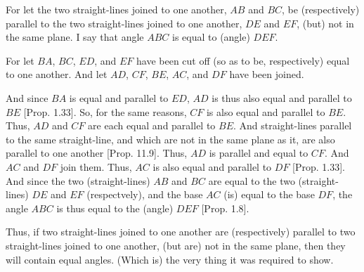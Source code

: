 \begin{Parallel}{}{}
{For let the two straight-lines joined to one another, $AB$ and $BC$, be (respectively) parallel to the two straight-lines joined to one another, $DE$ and $EF$, (but) not in the same plane. I say that angle $ABC$ is equal to
(angle) $DEF$.

For let $BA$, $BC$, $ED$, and $EF$ have been cut off (so as to be, respectively) equal
to one another. And let $AD$, $CF$, $BE$, $AC$, and $DF$
have been joined.

And since $BA$ is equal and parallel to $ED$, $AD$ is thus also equal
and parallel to $BE$ [Prop. 1.33]. So, for the
same reasons, $CF$ is also equal and parallel to $BE$. Thus, $AD$ and
$CF$ are each equal and parallel to $BE$. And straight-lines parallel to
the same straight-line, and which are not in the same plane as it, are also parallel
to one another [Prop. 11.9]. Thus, $AD$
is parallel and equal to $CF$. And $AC$ and $DF$ join them. Thus, $AC$
is also equal and parallel to $DF$ [Prop. 1.33].
And since the two (straight-lines) $AB$ and $BC$ are equal to the
two (straight-lines) $DE$ and $EF$ (respectvely),  and the base $AC$  (is) equal to the base $DF$, the angle $ABC$ is thus equal to the (angle) $DEF$   
[Prop. 1.8].

Thus, if two straight-lines joined to one another
are (respectively) parallel to two straight-lines joined to one another, (but are) not in the same
plane, then they will contain equal angles. (Which is) the very thing it
was required to show.}
\end{Parallel}

